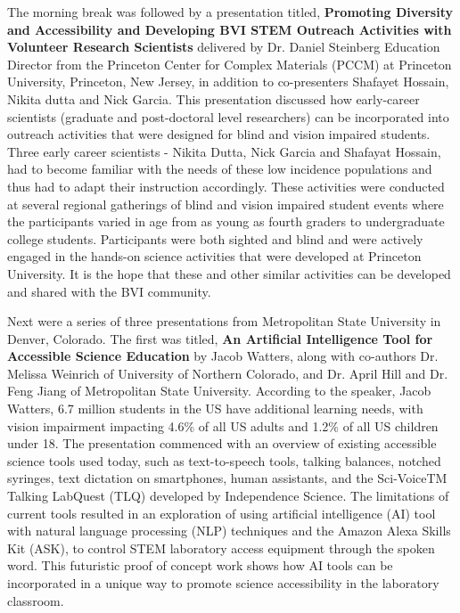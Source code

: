 \documentclass[11.5pt]{sig-alternate}
\begin{document}
\begin{large}
The morning break was followed by a presentation titled, \textbf{Promoting Diversity and Accessibility and Developing BVI STEM Outreach Activities with Volunteer Research Scientists} delivered by Dr. Daniel Steinberg Education Director from the Princeton Center for Complex Materials (PCCM) at Princeton University, Princeton, New Jersey, in addition to co-presenters Shafayet Hossain, Nikita dutta and Nick Garcia. This presentation discussed how early-career scientists (graduate and post-doctoral level researchers) can be incorporated into outreach activities that were designed for blind and vision impaired students. Three early career scientists - Nikita Dutta, Nick Garcia and Shafayat Hossain, had to become familiar with the needs of these low incidence populations and thus had to adapt their instruction accordingly. These activities were conducted at several regional gatherings of blind and vision impaired student events where the participants varied in age from as young as fourth graders to undergraduate college students. Participants were both sighted and blind and were actively engaged in the hands-on science activities that were developed at Princeton University. It is the hope that these and other similar activities can be developed and shared with the BVI community.

Next were a series of three presentations from Metropolitan State University in Denver, Colorado. The first was titled,\textbf{ An Artificial Intelligence Tool for Accessible Science Education} by Jacob Watters, along with co-authors Dr. Melissa Weinrich of University of Northern Colorado, and Dr. April Hill and Dr. Feng Jiang of Metropolitan State University. According to the speaker, Jacob Watters, 6.7 million students in the US have additional learning needs, with vision impairment impacting 4.6\% of all US adults and 1.2\% of all US children under 18. The presentation commenced with an overview of existing accessible science tools used today, such as text-to-speech tools, talking balances, notched syringes, text dictation on smartphones, human assistants, and the Sci-VoiceTM Talking LabQuest (TLQ) developed by Independence Science. The limitations of current tools resulted in an exploration of using artificial intelligence (AI) tool with natural language processing (NLP) techniques and the Amazon Alexa Skills Kit (ASK), to control STEM laboratory access equipment through the spoken word.  This futuristic proof of concept work shows how AI tools can be incorporated in a unique way to promote science accessibility in the laboratory classroom.


\end{large}
\end{document}
